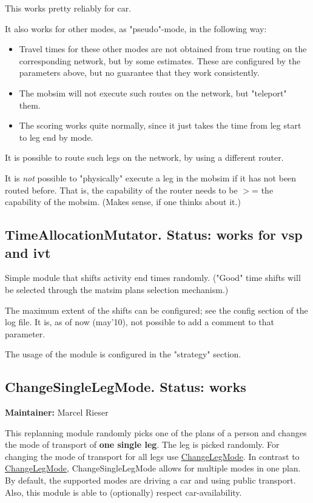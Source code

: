 \documentclass[a4paper,11pt]{report}
\begin{document}
This works pretty reliably for car.

It also works for other modes, as "pseudo"-mode, in the following way:
\begin{itemize}
	\item Travel times for these other modes are not obtained from true  routing on the corresponding network, but by some estimates. These  are configured by the parameters above, but no guarantee that they work  consistently.
	\item The mobsim will not execute such routes on the network, but "teleport" them.
	\item The scoring works quite normally, since it just takes the time from leg start to leg end by mode.
\end{itemize}

It is possible to route such legs on the network, by using a different router.

It is \emph{not} possible to "physically" execute a leg in the  mobsim if it has not been routed before. That is, the capability  of the router needs to be $>$= the capability of the mobsim.  (Makes sense, if one thinks about it.)

\subsection{TimeAllocationMutator.  Status: works for vsp and ivt}

Simple  module that shifts activity end times randomly. ("Good" time  shifts will be selected through the matsim plans selection mechanism.)

The maximum extent of the shifts can be configured; see the config  section of the log file. It is, as of now (may'10), not possible  to add a comment to that parameter.

The usage of the module is configured in the "strategy" section.

\subsection{ ChangeSingleLegMode. Status: works}

\textbf{Maintainer:} Marcel Rieser

This replanning module randomly picks one of the plans of a person and changes the mode of transport of \textbf{one single leg}. The leg is picked randomly. For changing the mode of transport for all legs use \href{http://www.matsim.org/node/387}{ChangeLegMode}. In contrast to \href{http://www.matsim.org/node/387}{ChangeLegMode},  ChangeSingleLegMode allows for multiple modes in one plan. By default,  the supported modes are driving a car and using public transport. Also,  this module is able to (optionally) respect car-availability.
\end{document}
